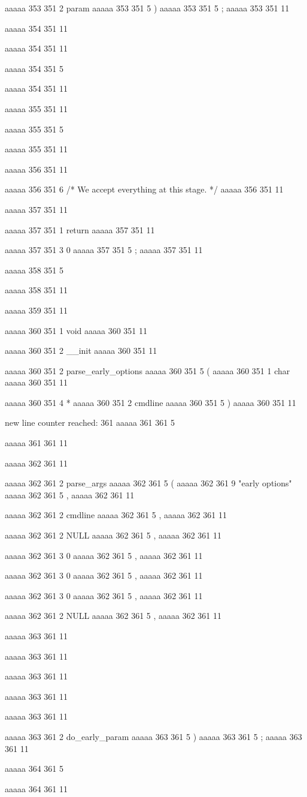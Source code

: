 {{{aaaaa 353 351
2
param
aaaaa 353 351
5
)
aaaaa 353 351
5
;
aaaaa 353 351
11


aaaaa 354 351
11
	
aaaaa 354 351
11
	
aaaaa 354 351
5
}
aaaaa 354 351
11


aaaaa 355 351
11
	
aaaaa 355 351
5
}
aaaaa 355 351
11


aaaaa 356 351
11
	
aaaaa 356 351
6
/* We accept everything at this stage. */
aaaaa 356 351
11


aaaaa 357 351
11
	
aaaaa 357 351
1
return
aaaaa 357 351
11
 
aaaaa 357 351
3
0
aaaaa 357 351
5
;
aaaaa 357 351
11


aaaaa 358 351
5
}
aaaaa 358 351
11


aaaaa 359 351
11


aaaaa 360 351
1
void
aaaaa 360 351
11
 
aaaaa 360 351
2
__init
aaaaa 360 351
11
 
aaaaa 360 351
2
parse_early_options
aaaaa 360 351
5
(
aaaaa 360 351
1
char
aaaaa 360 351
11
 
aaaaa 360 351
4
*
aaaaa 360 351
2
cmdline
aaaaa 360 351
5
)
aaaaa 360 351
11


new line counter reached: 361
aaaaa 361 361
5
{
aaaaa 361 361
11


aaaaa 362 361
11
	
aaaaa 362 361
2
parse_args
aaaaa 362 361
5
(
aaaaa 362 361
9
"early options"
aaaaa 362 361
5
,
aaaaa 362 361
11
 
aaaaa 362 361
2
cmdline
aaaaa 362 361
5
,
aaaaa 362 361
11
 
aaaaa 362 361
2
NULL
aaaaa 362 361
5
,
aaaaa 362 361
11
 
aaaaa 362 361
3
0
aaaaa 362 361
5
,
aaaaa 362 361
11
 
aaaaa 362 361
3
0
aaaaa 362 361
5
,
aaaaa 362 361
11
 
aaaaa 362 361
3
0
aaaaa 362 361
5
,
aaaaa 362 361
11
 
aaaaa 362 361
2
NULL
aaaaa 362 361
5
,
aaaaa 362 361
11


aaaaa 363 361
11
	
aaaaa 363 361
11
	
aaaaa 363 361
11
 
aaaaa 363 361
11
 
aaaaa 363 361
11
 
aaaaa 363 361
2
do_early_param
aaaaa 363 361
5
)
aaaaa 363 361
5
;
aaaaa 363 361
11


aaaaa 364 361
5
}
aaaaa 364 361
11


